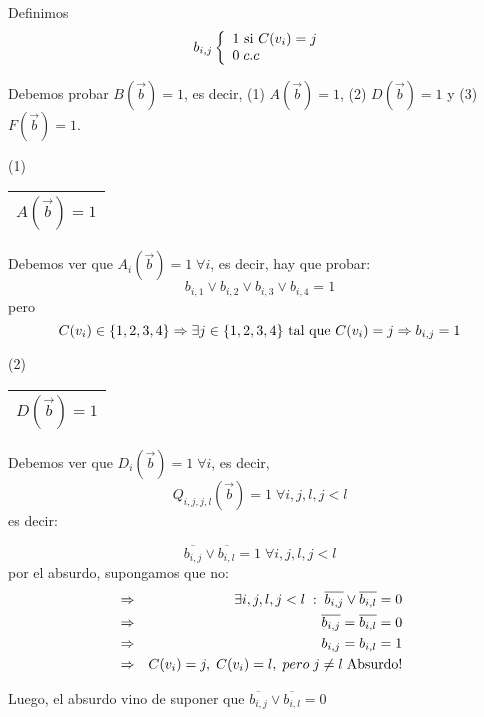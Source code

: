 \documentclass[12pt,a4paper]{report}
\newcounter{neq}
\begin{document}
				\vspace{5mm}
				\par Definimos
				\begin{equation*}
					b_{i, j}
		  			\left \lbrace
		  			\begin{array}{l}
		    		 1 \textup{ si } C(v_{i}) = j \\
		     		 0 \; c.c \\
		  			\end{array}
		  			\right.
				\end{equation*}
				\par Debemos probar $B(\overrightarrow{b}) = 1$, es decir, (1) $A(\overrightarrow{b}) = 1$, (2) $D(\overrightarrow{b}) = 1$ y (3) $F(\overrightarrow{b}) = 1$.

				\vspace{3mm}
				(1) \begin{tabular}{|c|} \hline $A(\overrightarrow{b}) = 1$ \\ \hline \end{tabular}
					\par Debemos ver que $A_{i}(\overrightarrow{b}) = 1 \; \forall i$, es decir, hay que probar:
					\[ b_{i, 1} \vee b_{i, 2} \vee b_{i, 3} \vee b_{i, 4} = 1 \]
					pero
					\[ C(v_{i}) \in \lbrace 1, 2, 3, 4 \rbrace \Rightarrow \exists j \in \lbrace 1, 2, 3, 4 \rbrace \textup{ tal que } C(v_{i}) = j \Rightarrow b_{i, j} = 1\]

				\vspace{3mm}
				(2) \begin{tabular}{|c|} \hline $D(\overrightarrow{b}) = 1$ \\ \hline \end{tabular}
					\par Debemos ver que $D_{i}(\overrightarrow{b}) = 1 \; \forall i$, es decir,
					\[ Q_{i, j, j, l}(\overrightarrow{b}) = 1 \; \forall i, j, l,  j < l \] es decir:

					\[ \overline{b_{i, j}} \vee \overline{b_{i, l}} = 1 \; \forall i, j, l, j <  l\]
					por el absurdo, supongamos que no:
					\begin{eqnarray}
						\nonumber &\Rightarrow & \exists i, j, l, j < l \; : \; \overline{b_{i, j}} \vee \overline{b_{i, l}} = 0 \\
						\nonumber &\Rightarrow & \overline{b_{i, j}} = \overline{b_{i, l}} = 0 \\
						\nonumber &\Rightarrow & b_{i, j} = b_{i, l} = 1 \\
						\nonumber &\Rightarrow & C(v_{i}) = j, \; C(v_{i}) = l, \; pero \; j \neq l \; \textup{Absurdo!}
					\end{eqnarray}
					\par Luego, el absurdo vino de suponer que $\overline{b_{i, j}} \vee \overline{b_{i, l}} = 0$
\end{document}
